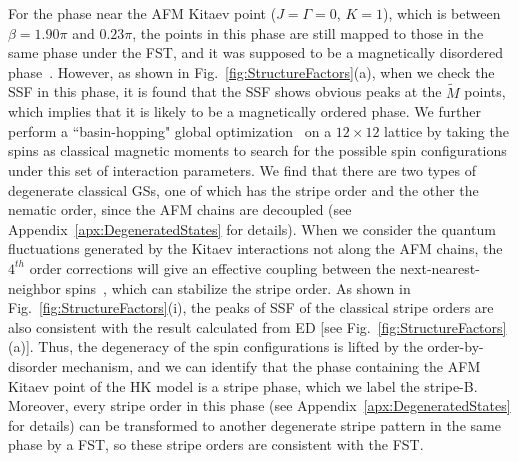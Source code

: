 \documentclass[aps,prb,reprint,amsfonts,amsmath,amssymb,showpacs,groupedaddress,superscriptaddress]{revtex4-1}
\begin{document}
For the phase near the AFM Kitaev point ($J=\Gamma=0$, $K=1$), which is between $\beta=1.90\pi$ and $0.23\pi$,  the points in this phase are still mapped to those in the same phase under the FST, and it was supposed to be a magnetically disordered phase~\cite{KaiLi2015}. However, as shown in Fig.~\ref{fig:StructureFactors}(a), when we check the SSF in this phase, it is found that the SSF shows obvious peaks at the $\tilde{M}$ points, which implies that it is likely to be a magnetically ordered phase. We further perform a ``basin-hopping" global optimization~\cite{jp970984n} on a $12 \times 12$ lattice by taking the spins as classical magnetic moments to search for the possible spin configurations under this set of interaction parameters. We find that there are two types of degenerate classical GSs, one of which has the stripe order and the other the nematic order, since the AFM chains are decoupled (see Appendix~\ref{apx:DegeneratedStates} for details). When we consider the quantum fluctuations generated by the Kitaev interactions not along the AFM chains, the $4^{th}$ order corrections will give an effective coupling between the next-nearest-neighbor spins~\cite{PhysRevB.92.184416}, which can stabilize the stripe order. As shown in Fig.~\ref{fig:StructureFactors}(i), the peaks of SSF of the classical stripe orders are also consistent with the result calculated from ED [see Fig.~\ref{fig:StructureFactors}(a)]. Thus, the degeneracy of the spin configurations is lifted by the order-by-disorder mechanism, and we can identify that the phase containing the AFM Kitaev point of the HK model is a stripe phase, which we label the stripe-B. Moreover, every stripe order in this phase (see Appendix~\ref{apx:DegeneratedStates} for details) can be transformed to another degenerate stripe pattern in the same phase by a FST, so these stripe orders are consistent with the FST.
\end{document}
